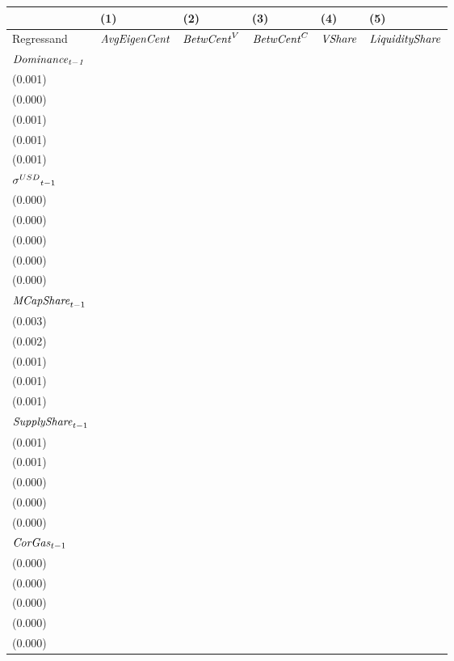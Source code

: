 \begin{tabular}{llllll}
\toprule
{} &                                   (1) &                                   (2) &                                   (3) &                                  (4) &                                  (5) \\
\midrule
Regressand                   &                  ${\it AvgEigenCent}$ &                    ${\it BetwCent}^V$ &                    ${\it BetwCent}^C$ &                       ${\it VShare}$ &               ${\it LiquidityShare}$ \\
$\it Dominance_{t-1}$        &   \makecell{$0.836^{***}$ \\ (0.001)} &   \makecell{$0.967^{***}$ \\ (0.000)} &   \makecell{$0.960^{***}$ \\ (0.001)} &  \makecell{$0.897^{***}$ \\ (0.001)} &  \makecell{$0.926^{***}$ \\ (0.001)} \\
${{\it \sigma}^{USD}}_{t-1}$ &      \makecell{$0.000^{}$ \\ (0.000)} &      \makecell{$0.000^{}$ \\ (0.000)} &      \makecell{$0.000^{}$ \\ (0.000)} &     \makecell{$0.000^{}$ \\ (0.000)} &     \makecell{$0.000^{}$ \\ (0.000)} \\
${{\it MCapShare}}_{t-1}$    &   \makecell{$0.025^{***}$ \\ (0.003)} &   \makecell{$0.050^{***}$ \\ (0.002)} &   \makecell{$0.048^{***}$ \\ (0.001)} &  \makecell{$0.045^{***}$ \\ (0.001)} &  \makecell{$0.049^{***}$ \\ (0.001)} \\
${{\it SupplyShare}}_{t-1}$  &   \makecell{$0.035^{***}$ \\ (0.001)} &   \makecell{$0.002^{***}$ \\ (0.001)} &    \makecell{$0.001^{**}$ \\ (0.000)} &  \makecell{$0.012^{***}$ \\ (0.000)} &    \makecell{$-0.000^{}$ \\ (0.000)} \\
${{\it CorGas}}_{t-1}$       &      \makecell{$0.000^{}$ \\ (0.000)} &      \makecell{$0.000^{}$ \\ (0.000)} &      \makecell{$0.000^{}$ \\ (0.000)} &    \makecell{$-0.000^{}$ \\ (0.000)} &    \makecell{$-0.000^{}$ \\ (0.000)} \\

\end{tabular}
